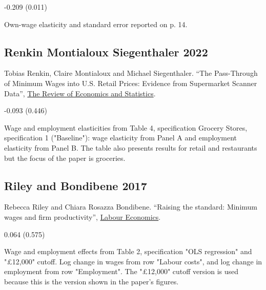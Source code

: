 \vspace{0.7em}

 -0.209 (0.011)

\vspace{0.7em}

 Own-wage elasticity and standard error reported on p. 14.

\subsection*{Renkin Montialoux Siegenthaler 2022}
\vspace{-0.7em}

\noindent Tobias Renkin, Claire Montialoux and Michael Siegenthaler. ``The Pass-Through of Minimum Wages into U.S. Retail Prices: Evidence from Supermarket Scanner Data'', \href{https://doi.org/10.1162/rest_a_00981}{The Review of Economics and Statistics}.

\vspace{0.7em}

 -0.093 (0.446)

\vspace{0.7em}

 Wage and employment elasticities from Table 4, specification Grocery Stores, specification 1 ("Baseline"): wage elasticity from Panel A and employment elasticity from Panel B. The table also presents results for retail and restaurants but the focus of the paper is groceries.

\subsection*{Riley and Bondibene 2017}
\vspace{-0.7em}

\noindent Rebecca Riley and Chiara Rosazza Bondibene. ``Raising the standard: Minimum wages and ﬁrm productivity'', \href{http://dx.doi.org/10.1016/j.labeco.2016.11.010}{Labour Economics}.

\vspace{0.7em}

 0.064 (0.575)

\vspace{0.7em}

 Wage and employment effects from Table 2, specification "OLS regression" and "£12,000" cutoff. Log change in wages from row "Labour costs", and log change in employment from row "Employment". The "£12,000" cutoff version is used because this is the version shown in the paper's figures.

